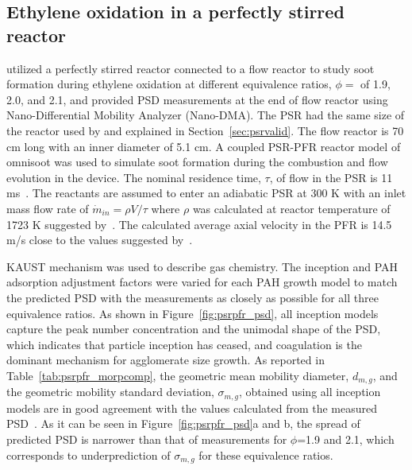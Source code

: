 \subsection{Ethylene oxidation in a perfectly stirred reactor}

\citet{manzello2007soot} utilized a perfectly stirred reactor connected to a flow reactor to study soot formation during ethylene oxidation at different equivalence ratios, $\phi=$ of 1.9, 2.0, and 2.1, and provided PSD measurements at the end of flow reactor using Nano-Differential Mobility Analyzer (Nano-DMA). The PSR had the same size of the reactor used by \citet{manzello2007soot} and explained in Section~\ref{sec:psrvalid}. The flow reactor is 70 cm long with an inner diameter of 5.1 cm. A coupled PSR-PFR reactor model of omnisoot was used to simulate soot formation during the combustion and flow evolution in the device. The nominal residence time, $\tau$, of flow in the PSR is 11 ms~\citep{manzello2007soot}. The reactants are assumed to enter an adiabatic PSR at 300 K with an inlet mass flow rate of $\dot{m}_{in}=\rho V / \tau$ where $\rho$ was calculated at reactor temperature of 1723 K suggested by~\citet{lenhert2009effects}. The calculated average axial velocity in the PFR is 14.5 m/s close to the values suggested by~\citet{manzello2007soot}. 

KAUST mechanism was used to describe gas chemistry. The inception and PAH adsorption adjustment factors were varied for each PAH growth model to match the predicted PSD with the measurements as closely as possible for all three equivalence ratios. As shown in Figure~\ref{fig:psrpfr_psd}, all inception models capture the peak number concentration and the unimodal shape of the PSD, which indicates that particle inception has ceased, and coagulation is the dominant mechanism for agglomerate size growth. As reported in Table~\ref{tab:psrpfr_morpcomp}, the geometric mean mobility diameter, $d_{m,g}$, and the geometric mobility standard deviation, $\sigma_{m,g}$, obtained using all inception models are in good agreement with the values calculated from the measured PSD~\citep{manzello2007soot}. As it can be seen in Figure~\ref{fig:psrpfr_psd}a and b, the spread of predicted PSD is narrower than that of measurements for $\phi$=1.9 and 2.1, which corresponds to underprediction of $\sigma_{m,g}$ for these equivalence ratios.


